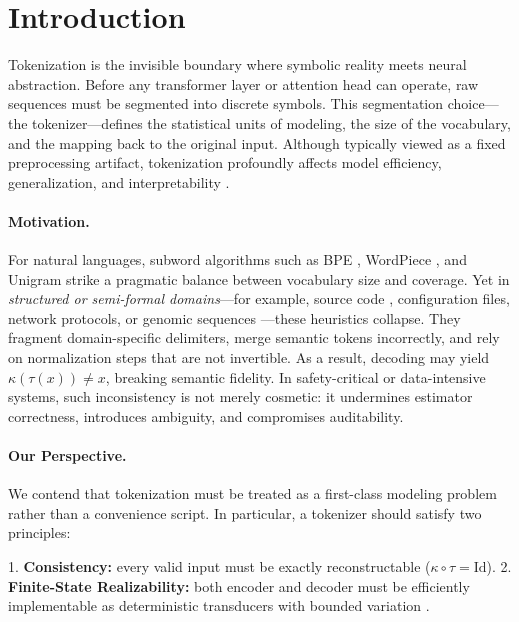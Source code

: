 \section{Introduction}
\label{sec:intro}

Tokenization is the invisible boundary where symbolic reality meets neural abstraction.  
Before any transformer layer or attention head can operate, raw sequences must be segmented into discrete symbols.  
This segmentation choice---the tokenizer---defines the statistical units of modeling, the size of the vocabulary, and the mapping back to the original input.  
Although typically viewed as a fixed preprocessing artifact, tokenization profoundly affects model efficiency, generalization, and interpretability \citep{bostrom2020byte, xue2022byt5, clark2022canine, gao2023representation}.  

\paragraph{Motivation.}
For natural languages, subword algorithms such as BPE \citep{gage1994bpe}, WordPiece \citep{wu2016google}, and Unigram \citep{kudo2018sentencepiece} strike a pragmatic balance between vocabulary size and coverage.  
Yet in \emph{structured or semi-formal domains}---for example, source code \citep{feng2020codebert, wang2021codet5}, configuration files, network protocols, or genomic sequences \citep{ji2021dnabert, zhou2023proteinbert}---these heuristics collapse.  
They fragment domain-specific delimiters, merge semantic tokens incorrectly, and rely on normalization steps that are not invertible.  
As a result, decoding may yield $\kappa(\tau(x)) \ne x$, breaking semantic fidelity.  
In safety-critical or data-intensive systems, such inconsistency is not merely cosmetic: it undermines estimator correctness, introduces ambiguity, and compromises auditability.

\paragraph{Our Perspective.}
We contend that tokenization must be treated as a first-class modeling problem rather than a convenience script.  
In particular, a tokenizer should satisfy two principles:

1. \textbf{Consistency:} every valid input must be exactly reconstructable ($\kappa\!\circ\!\tau = \mathrm{Id}$).  
2. \textbf{Finite-State Realizability:} both encoder and decoder must be efficiently implementable as deterministic transducers with bounded variation \citep{mohri1997finite}.  

